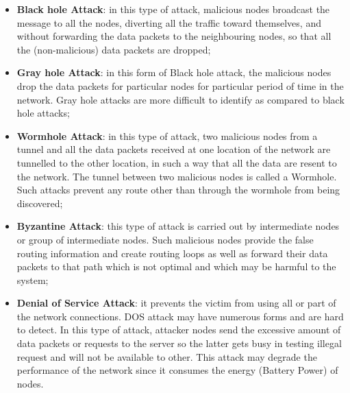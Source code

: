 \documentclass[compsoc, conference, letterpaper, 10pt, times]{IEEEtran}
\begin{document}
\begin{itemize}
\item  \textbf{Black hole Attack}: in this type of attack, malicious nodes broadcast the message to all the nodes,
diverting all the
traffic toward themselves, and without forwarding the data packets to the neighbouring nodes, so that all the (non-malicious) data packets
are dropped;

\item \textbf{Gray hole Attack}: in this form of Black hole attack, the malicious nodes drop the data packets for particular nodes for particular period of time in the network. Gray hole attacks are more difficult to identify as compared to black hole attacks;

\item \textbf{Wormhole Attack}: in this type of attack, two malicious nodes from a tunnel and all the data packets received at one location of the network are tunnelled to the other location, in such a way that all the data are resent to the network. The tunnel between two malicious nodes is called a Wormhole. Such attacks prevent any route other than through the wormhole from being discovered;

\item \textbf{Byzantine Attack}: this type of attack is carried out by intermediate nodes or group of intermediate nodes. Such malicious nodes provide the false routing information and create routing loops as well as forward their data packets to that path which is not optimal and which may be harmful to the system;

\item \textbf{Denial of Service Attack}: it prevents the victim from using all or part of the network connections. DOS attack may have numerous forms and are hard to detect. In this type of attack, attacker nodes send the
excessive amount of data packets or requests to the server so the latter gets busy in testing illegal request and will not be available to other. This attack may degrade the performance of the network since it consumes the
energy (Battery Power) of nodes.
\end{itemize}
\end{document}
